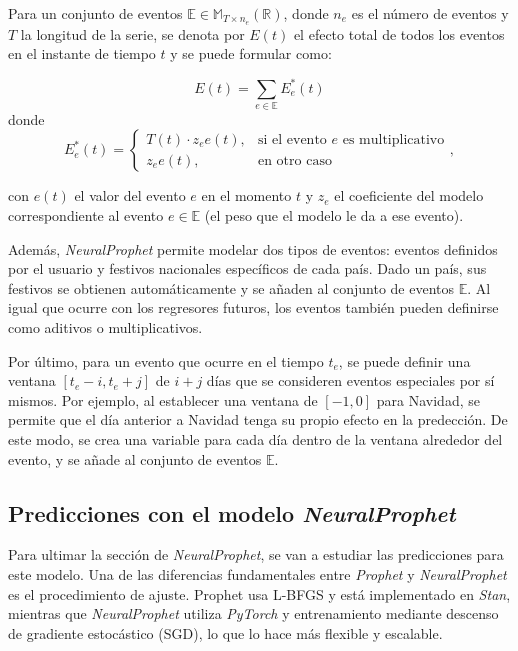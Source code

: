 \documentclass[12pt,twoside]{article}
\begin{document}
Para un conjunto de eventos $\mathbb{E} \in \mathbb{M}_{T \times n_e}(\mathbb{R})$, donde $n_e$ es el número de eventos y $T$ la longitud de la serie, se denota por $E(t)$ el efecto total de todos los eventos en el instante de tiempo $t$ y se puede formular como:

\begin{equation}
E(t) = \sum_{e \in \mathbb{E}} E_e^*(t)
\end{equation}
 donde 
\begin{equation}
E_e^*(t) =
\begin{cases}
T(t) \cdot z_ee(t), & \text{si el evento } e \text{ es multiplicativo} \\
z_ee(t), & \text{en otro caso}
\end{cases},
\end{equation}

con $e(t)$ el valor del evento $e$ en el momento $t$ y $z_e$ el coeficiente del modelo correspondiente al evento $e\in \mathbb{E}$ (el peso que el modelo le da a ese evento).

Además, \textit{NeuralProphet} permite modelar dos tipos de eventos: eventos definidos por el usuario y festivos nacionales específicos de cada país. Dado un país, sus festivos se obtienen automáticamente y se añaden al conjunto de eventos $\mathbb{E}$. Al igual que ocurre con los regresores futuros, los eventos también pueden definirse como aditivos o multiplicativos.

Por último, para un evento que ocurre en el tiempo $t_e$, se puede definir una ventana $[t_e-i,t_e+j]$ de $i+j$ días que se consideren eventos especiales por sí mismos. Por ejemplo, al establecer una ventana de $[-1,0]$ para Navidad, se permite que el día anterior a Navidad tenga su propio efecto en la predección. De este modo, se crea una variable para cada día dentro de la ventana alrededor del evento, y se añade al conjunto de eventos $\mathbb{E}$. 


\subsection{Predicciones con el modelo \textit{NeuralProphet}}\label{sec:31}

Para ultimar la sección de \textit{NeuralProphet}, se van a estudiar las predicciones para este modelo. Una de las diferencias fundamentales entre \textit{Prophet} y \textit{NeuralProphet} es el procedimiento de ajuste. Prophet usa L-BFGS y está implementado en \textit{Stan}, mientras que \textit{NeuralProphet} utiliza \textit{PyTorch} y entrenamiento mediante descenso de gradiente estocástico (SGD), lo que lo hace más flexible y escalable.
\end{document}
